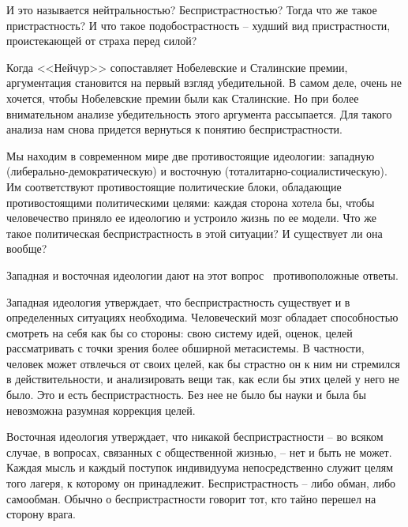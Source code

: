 \documentclass{book}
\begin{document}
{И это называется нейтральностью? Беспристрастностью? Тогда что же такое пристрастность? И что такое подобостра­стность --  худший вид пристрастности, проистекающей от стра­ха перед силой?

Когда <<Нейчур>> сопоставляет Нобелевские и Сталинские премии, аргументация становится на первый взгляд убедитель­ной. В самом деле, очень не хочется, чтобы Нобелевские пре­мии были как Сталинские. Но при более внимательном анали­зе убедительность этого аргумента рассыпается. Для такого анализа нам снова придется вернуться к понятию бесприст­растности.

Мы находим в современном мире две противостоящие иде­ологии: западную (либерально-демократическую) и восточ­ную (тоталитарно-социалистическую). Им соответствуют проти­востоящие политические блоки, обладающие противостоящи­ми политическими целями: каждая сторона хотела бы, чтобы человечество приняло ее идеологию и устроило жизнь по ее модели. Что же такое политическая беспристрастность в этой ситуации? И существует ли она вообще?

Западная и восточная идеологии дают на этот вопрос  проти­воположные ответы.

Западная идеология утверждает, что беспристрастность су­ществует и в определенных ситуациях необходима. Человече­ский мозг обладает способностью смотреть на себя как бы со стороны: свою систему идей, оценок, целей рассматривать с точки зрения более обширной метасистемы. В частности, человек может отвлечься от своих целей, как бы страстно он к ним ни стремился в действительности, и анализировать вещи так, как если бы этих целей у него не было. Это и есть беспристрастность. Без нее не было бы науки и была бы невозможна разумная коррекция целей.

Восточная идеология утверждает, что никакой беспристрастности -- во всяком случае, в вопросах, связанных с общественной жизнью, -- нет и быть не может. Каждая мысль и каждый поступок индивидуума непосредственно служит целям того лагеря, к которому он принадлежит. Беспристрастность -- либо обман, либо самообман. Обычно о беспристрастности говорит тот, кто тайно перешел на сторону врага.

}
\end{document}

